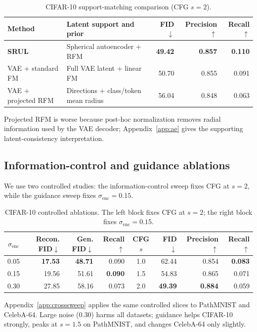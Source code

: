 \documentclass{article}
\begin{document}
\begin{table}[H]
\centering
\small
\caption{CIFAR-10 support-matching comparison (CFG $s=2$).}
\label{tab:support}
\setlength{\tabcolsep}{6pt}
\begin{tabular}{p{2.75cm}p{4.2cm}rrr}
\toprule
Method & Latent support and prior & FID$\downarrow$ & Precision$\uparrow$ & Recall$\uparrow$ \\
\midrule
\textbf{SRUL} & Spherical autoencoder + RFM & \textbf{49.42} & \textbf{0.857} & \textbf{0.110} \\
VAE + standard FM & Full VAE latent + linear FM & 50.70 & 0.855 & 0.091 \\
VAE + projected RFM & Directions + class/token mean radius & 56.04 & 0.848 & 0.063 \\
\bottomrule
\end{tabular}
\end{table}

Projected RFM is worse because post-hoc normalization removes radial information used by the VAE decoder; Appendix~\ref{app:ae} gives the supporting latent-consistency interpretation.

\subsection*{Information-control and guidance ablations}
We use two controlled studies: the information-control sweep fixes CFG at $s=2$, while the guidance sweep fixes $\sigma_{\mathrm{enc}}=0.15$.

\begin{table}[H]
\centering
\scriptsize
\caption{CIFAR-10 controlled ablations. The left block fixes CFG at $s=2$; the right block fixes $\sigma_{\mathrm{enc}}=0.15$.}
\label{tab:controls}
\setlength{\tabcolsep}{4.1pt}
\begin{tabular}{crrr|crrr}
\toprule
$\sigma_{\mathrm{enc}}$ & Recon. FID$\downarrow$ & Gen. FID$\downarrow$ & Recall$\uparrow$ & CFG $s$ & FID$\downarrow$ & Precision$\uparrow$ & Recall$\uparrow$ \\
\midrule
0.05 & \textbf{17.53} & \textbf{48.71} & 0.090 & 1.0 & 62.44 & 0.854 & \textbf{0.083} \\
0.15 & 19.56 & 51.61 & \textbf{0.090} & 1.5 & 54.83 & 0.865 & 0.071 \\
0.30 & 27.85 & 58.16 & 0.073 & 2.0 & \textbf{49.39} & \textbf{0.884} & 0.059 \\
\bottomrule
\end{tabular}
\end{table}
Appendix~\ref{app:crosssweep} applies the same controlled slices to PathMNIST and CelebA-64. Large noise ($0.30$) harms all datasets; guidance helps CIFAR-10 strongly, peaks at $s=1.5$ on PathMNIST, and changes CelebA-64 only slightly.
\end{document}
